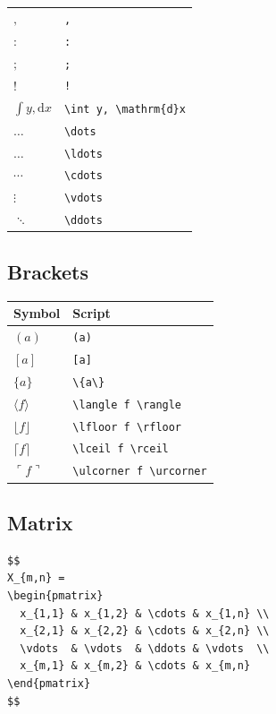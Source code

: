 \documentclass[
]{book}
\begin{document}
\begin{longtable}[]{@{}ll@{}}
\(,\) & \texttt{,} \\
\(:\) & \texttt{:} \\
\(;\) & \texttt{;} \\
\(!\) & \texttt{!} \\
\(\int y, \mathrm{d}x\) & \texttt{\textbackslash{}int\ y,\ \textbackslash{}mathrm\{d\}x} \\
\(\dots\) & \texttt{\textbackslash{}dots} \\
\(\ldots\) & \texttt{\textbackslash{}ldots} \\
\(\cdots\) & \texttt{\textbackslash{}cdots} \\
\(\vdots\) & \texttt{\textbackslash{}vdots} \\
\(\ddots\) & \texttt{\textbackslash{}ddots} \\
\end{longtable}

\hypertarget{brackets}{%
\subsection{Brackets}\label{brackets}}

\begin{longtable}[]{@{}ll@{}}
\toprule\noalign{}
Symbol & Script \\
\midrule\noalign{}
\endhead
\bottomrule\noalign{}
\endlastfoot
\((a)\) & \texttt{(a)} \\
\([a]\) & \texttt{{[}a{]}} \\
\(\{a\}\) & \texttt{\textbackslash{}\{a\textbackslash{}\}} \\
\(\langle f \rangle\) & \texttt{\textbackslash{}langle\ f\ \textbackslash{}rangle} \\
\(\lfloor f \rfloor\) & \texttt{\textbackslash{}lfloor\ f\ \textbackslash{}rfloor} \\
\(\lceil f \rceil\) & \texttt{\textbackslash{}lceil\ f\ \textbackslash{}rceil} \\
\(\ulcorner f \urcorner\) & \texttt{\textbackslash{}ulcorner\ f\ \textbackslash{}urcorner} \\
\end{longtable}

\hypertarget{matrix}{%
\subsection{Matrix}\label{matrix}}

\begin{verbatim}
$$
X_{m,n} = 
\begin{pmatrix}
  x_{1,1} & x_{1,2} & \cdots & x_{1,n} \\
  x_{2,1} & x_{2,2} & \cdots & x_{2,n} \\
  \vdots  & \vdots  & \ddots & \vdots  \\
  x_{m,1} & x_{m,2} & \cdots & x_{m,n} 
\end{pmatrix}
$$
\end{verbatim}
\end{document}
